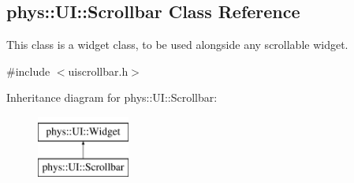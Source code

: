 \hypertarget{classphys_1_1UI_1_1Scrollbar}{
\subsection{phys::UI::Scrollbar Class Reference}
\label{classphys_1_1UI_1_1Scrollbar}
}


This class is a widget class, to be used alongside any scrollable widget.  




{\ttfamily \#include $<$uiscrollbar.h$>$}

Inheritance diagram for phys::UI::Scrollbar:\begin{figure}[H]
\begin{center}
\leavevmode
\includegraphics[height=2.000000cm]{classphys_1_1UI_1_1Scrollbar}
\end{center}
\end{figure}
